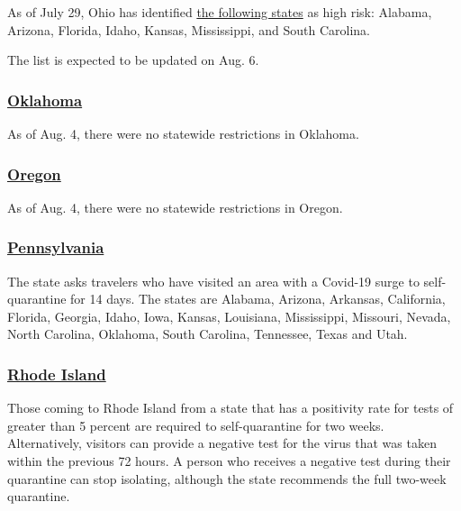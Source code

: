 As of July 29, Ohio has identified
\href{https://coronavirus.ohio.gov/wps/portal/gov/covid-19/families-and-individuals/COVID-19-Travel-Advisory/COVID-19-Travel-Advisory}{the
following states} as high risk: Alabama, Arizona, Florida, Idaho,
Kansas, Mississippi, and South Carolina.

The list is expected to be updated on Aug. 6.

\hypertarget{oklahoma}{%
\subsubsection{\texorpdfstring{\href{https://coronavirus.health.ok.gov/travel}{Oklahoma}}{Oklahoma}}\label{oklahoma}}

As of Aug. 4, there were no statewide restrictions in Oklahoma.

\hypertarget{oregon}{%
\subsubsection{\texorpdfstring{\href{https://traveloregon.com/travel-alerts/}{Oregon}}{Oregon}}\label{oregon}}

As of Aug. 4, there were no statewide restrictions in Oregon.

\hypertarget{pennsylvania}{%
\subsubsection{\texorpdfstring{\href{https://www.health.pa.gov/topics/disease/coronavirus/Pages/Travelers.aspx}{Pennsylvania}}{Pennsylvania}}\label{pennsylvania}}

The state asks travelers who have visited an area with a Covid-19 surge
to self-quarantine for 14 days. The states are Alabama, Arizona,
Arkansas, California, Florida, Georgia, Idaho, Iowa, Kansas, Louisiana,
Mississippi, Missouri, Nevada, North Carolina, Oklahoma, South Carolina,
Tennessee, Texas and Utah.

\hypertarget{rhode-island}{%
\subsubsection{\texorpdfstring{\href{https://health.ri.gov/covid/}{Rhode
Island}}{Rhode Island}}\label{rhode-island}}

Those coming to Rhode Island from a state that has a positivity rate for
tests of greater than 5 percent are required to self-quarantine for two
weeks. Alternatively, visitors can provide a negative test for the virus
that was taken within the previous 72 hours. A person who receives a
negative test during their quarantine can stop isolating, although the
state recommends the full two-week quarantine.

